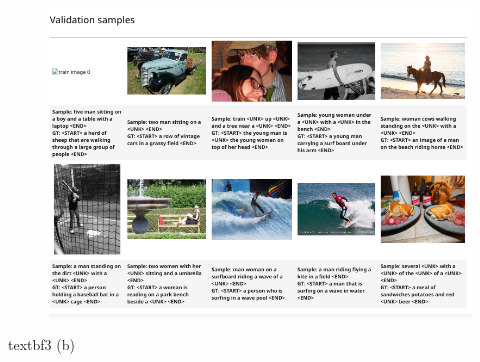 \documentclass[12 pt]{article}        	%
\begin{document}
\begin{figure}[h!]
  \includegraphics[width=0.7\linewidth]{captions_validation.png}
\end{figure}

\clearpage 

textbf{3 (b)}
\end{document}
